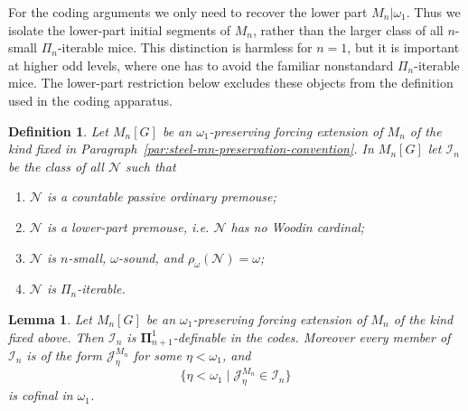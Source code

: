 \documentclass[a4paper,11pt]{article}
\newtheorem{lemma}[theorem]{Lemma}
\newtheorem{definition}[theorem]{Definition}
\begin{document}
For the coding arguments we only need to recover the lower part $M_n|\omega_1$.  Thus we isolate the lower-part initial segments of $M_n$, rather than the larger class of all $n$-small $\Pi_n$-iterable mice.  This distinction is harmless for $n=1$, but it is important at higher odd levels, where one has to avoid the familiar nonstandard $\Pi_n$-iterable mice.  The lower-part restriction below excludes these objects from the definition used in the coding apparatus.

\begin{definition}\label{def:mn-lower-part-approximations}
Let $M_n[G]$ be an $\omega_1$-preserving forcing extension of $M_n$ of the kind fixed in Paragraph~\ref{par:steel-mn-preservation-convention}.  In $M_n[G]$ let $\mathcal I_n$ be the class of all $\mathcal N$ such that
\begin{enumerate}
   \item $\mathcal N$ is a countable passive ordinary premouse;
   \item $\mathcal N$ is a lower-part premouse, i.e. $\mathcal N$ has no Woodin cardinal;
   \item $\mathcal N$ is $n$-small, $\omega$-sound, and $\rho_\omega(\mathcal N)=\omega$;
   \item $\mathcal N$ is $\Pi_n$-iterable.
\end{enumerate}
\end{definition}

\begin{lemma}\label{lem:definable-mn-initial-segments}
Let $M_n[G]$ be an $\omega_1$-preserving forcing extension of $M_n$ of the kind fixed above.  Then $\mathcal I_n$ is $\boldsymbol{\Pi}^1_{n+1}$-definable in the codes.  Moreover every member of $\mathcal I_n$ is of the form $\mathcal J^{M_n}_\eta$ for some $\eta<\omega_1$, and
\[
   \{\eta<\omega_1\mid \mathcal J^{M_n}_\eta\in\mathcal I_n\}
\]
is cofinal in $\omega_1$.
\end{lemma}
\end{document}
